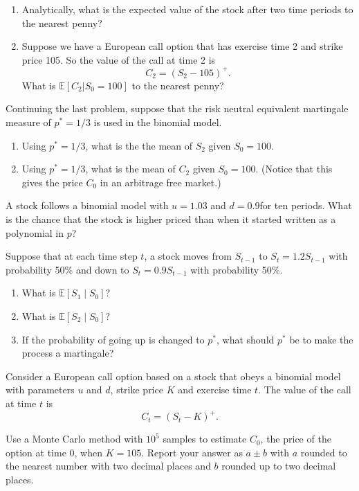 \documentclass[
]{article}
\begin{document}
\begin{enumerate}
\def\labelenumi{\alph{enumi}.}
\item
  Analytically, what is the expected value of the stock after two time
  periods to the nearest penny?
\item
  Suppose we have a European call option that has exercise time 2 and
  strike price 105. So the value of the call at time 2 is \[
   C_2 = (S_2 − 105)^+.
   \] What is \(\mathbb{E}[C_2|S_0 = 100]\) to the nearest penny?
\end{enumerate}

Continuing the last problem, suppose that the risk neutral equivalent
martingale measure of \(p^* = 1 / 3\) is used in the binomial model.

\begin{enumerate}
\def\labelenumi{\alph{enumi}.}
\item
  Using \(p^* = 1 / 3\), what is the the mean of \(S_2\) given
  \(S_0 = 100\).
\item
  Using \(p^* = 1 / 3\), what is the mean of \(C_2\) given
  \(S_0 = 100\). (Notice that this gives the price \(C_0\) in an
  arbitrage free market.)
\end{enumerate}

A stock follows a binomial model with \(u = 1.03\) and \(d = 0.9\)for
ten periods. What is the chance that the stock is higher priced than
when it started written as a polynomial in \(p\)?

Suppose that at each time step \(t\), a stock moves from \(S_{t - 1}\)
to \(S_t = 1.2 S_{t - 1}\) with probability 50\% and down to
\(S_t = 0.9 S_{t - 1}\) with probability 50\%.

\begin{enumerate}
\def\labelenumi{\alph{enumi}.}
\item
  What is \(\mathbb{E}[S_1 \mid S_0]\)?
\item
  What is \(\mathbb{E}[S_2 \mid S_0]\)?
\item
  If the probability of going up is changed to \(p^*\), what should
  \(p^*\) be to make the process a martingale?
\end{enumerate}

Consider a European call option based on a stock that obeys a binomial
model with parameters \(u\) and \(d\), strike price \(K\) and exercise
time \(t\). The value of the call at time \(t\) is \[
C_t = (S_t - K)^+.
\]

Use a Monte Carlo method with \(10^5\) samples to estimate \(C_0\), the
price of the option at time 0, when \(K = 105\). Report your answer as
\(a \pm b\) with \(a\) rounded to the nearest number with two decimal
places and \(b\) rounded up to two decimal places.
\end{document}
